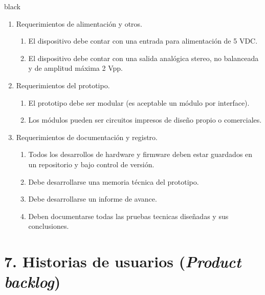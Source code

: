 \documentclass[
11pt, %
]{charter}
\begin{document}
\begin{consigna}{black}
\begin{enumerate}
\begin{enumerate}
		\end{enumerate}
	\item Requerimientos de alimentación y otros.
		\begin{enumerate}
			\item El dispositivo debe contar con una entrada para alimentación de 5 VDC.
			\item El dispositivo debe contar con una salida analógica stereo, no balanceada y de amplitud máxima 2 Vpp.
		\end{enumerate}
	\item Requerimientos del prototipo.
		\begin{enumerate}
			\item El prototipo debe ser modular (es aceptable un módulo por interface).
			\item Los módulos pueden ser circuitos impresos de diseño propio o comerciales.
		\end{enumerate}
	\item Requerimientos de documentación y registro.
		\begin{enumerate}
			\item Todos los desarrollos de hardware y firmware deben estar guardados en un repositorio y bajo control de versión.
			\item Debe desarrollarse una memoria técnica del prototipo.
			\item Debe desarrollarse un informe de avance. 
			\item Deben documentarse todas las pruebas tecnicas diseñadas y sus conclusiones. 
		\end{enumerate}	
\end{enumerate}

\end{consigna}

\section{7. Historias de usuarios (\textit{Product backlog})}
\label{sec:backlog}
\end{document}
